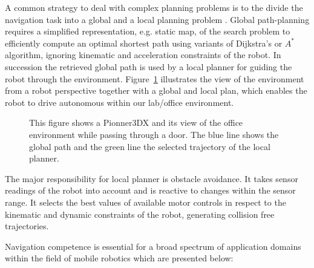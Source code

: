 A common strategy to deal with complex planning problems is to the divide the navigation task into a global and a local planning problem \cite{LaValle2006}.
Global path-planning requires a simplified representation, e.g. static map, of the search problem to efficiently compute an optimal shortest path using variants of Dijkstra's \cite{dijkstra1959note} or $A^*$ \cite{DBLP:journals/tssc/HartNR68/Astar} algorithm, ignoring kinematic and acceleration constraints of the robot.
In succession the retrieved global path is used by a local planner for guiding the robot through the environment.
Figure~\ref{fig:fig_pioneer} illustrates the view of the environment from a robot perspective together with a global and local plan, which enables the robot to drive autonomous within our lab/office environment.

\begin{figure}[thpb]
      \centering
      \def\svgwidth{\textwidth}
      
      \caption[Global and local planning.]{This figure shows a Pionner3DX and its view of the office environment while passing through a door. The blue line shows the global path and the green line the selected trajectory of the local planner.}
      \label{fig:fig_pioneer}
\end{figure}

The major responsibility for local planner is obstacle avoidance. It takes sensor readings of the robot into account and is reactive to changes within the sensor range. 
It selects the best values of available motor controls in respect to the kinematic and dynamic constraints of the robot, generating collision free trajectories. 
   
Navigation competence is essential for a broad spectrum of application domains within the field of mobile robotics which are presented below:

